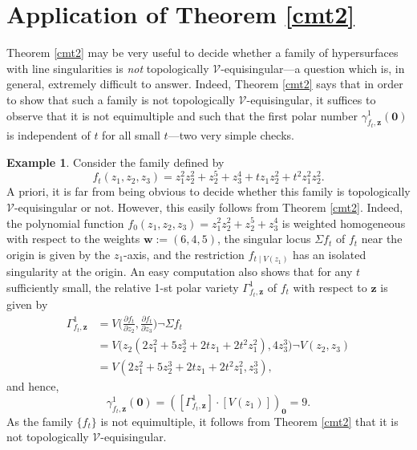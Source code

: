 \documentclass[a4paper,fleqn,11pt]{amsart}
\theoremstyle{definition}
\newtheorem{example}[theorem]{Example}
\theoremstyle{remark}
\numberwithin{equation}{section}
\begin{document}
\section{Application of Theorem \ref{cmt2}}\label{appli}

Theorem \ref{cmt2} may be very useful to decide whether a family of hypersurfaces with line singularities is \emph{not} topologically $\mathscr{V}$-equisingular---a question which is, in general, extremely difficult to answer. 
Indeed, Theorem \ref{cmt2} says that in order to show that such a family is not topologically $\mathscr{V}$-equisingular, it suffices to observe that it is not equimultiple and such that the first polar number $\gamma^1_{f_t,\mathbf{z}} (\mathbf{0})$ is independent of $t$ for all small $t$---two very simple checks.

\begin{example}
Consider the family defined by 
\begin{equation*}
f_t(z_1,z_2,z_3)=z_1^2z_2^2+z_2^5+z_3^4+tz_1z_2^2+t^2z_1^2z_2^2.
\end{equation*}
A priori, it is far from being obvious to decide whether this family is topologically $\mathscr{V}$-equisingular or not. However, this easily follows from Theorem \ref{cmt2}. Indeed, the polynomial function $f_0(z_1,z_2,z_3)=z_1^2z_2^2+z_2^5+z_3^4$ is weighted homogeneous with respect to the weights $\mathbf{w}:=(6,4,5)$, the singular locus $\Sigma f_t$ of $f_t$ near the origin is given by the $z_1$-axis, and the restriction $f_{t\mid V(z_1)}$ has an isolated singularity at the origin. An easy computation also shows that for any $t$ sufficiently small, the relative 1-st polar variety $\Gamma^1_{f_t,\mathbf{z}}$ of $f_t$ with respect to $\mathbf{z}$ is given by
\begin{align*}
\Gamma^1_{f_t,\mathbf{z}} & = V\biggl( \frac{\partial f_t}{\partial z_2},\frac{\partial f_t}{\partial z_3} \biggr)\lnot\Sigma f_t\\
& = V\bigl(z_2(2z_1^2+5z_2^3+2tz_1+2t^2z_1^2),4z_3^3\bigr)\lnot V(z_2,z_3)\\
& = V(2z_1^2+5z_2^3+2tz_1+2t^2z_1^2,z_3^3),
\end{align*}
and hence,
\begin{equation*}
\gamma^1_{f_t,\mathbf{z}}(\mathbf{0}) = 
([\Gamma^1_{f_t,\mathbf{z}}]\cdot[V(z_1)])_{\mathbf{0}}=9.
\end{equation*}
As the family $\{f_t\}$ is not equimultiple, it follows from Theorem \ref{cmt2} that it is not topologically $\mathscr{V}$-equisingular.
\end{example}
\end{document}
